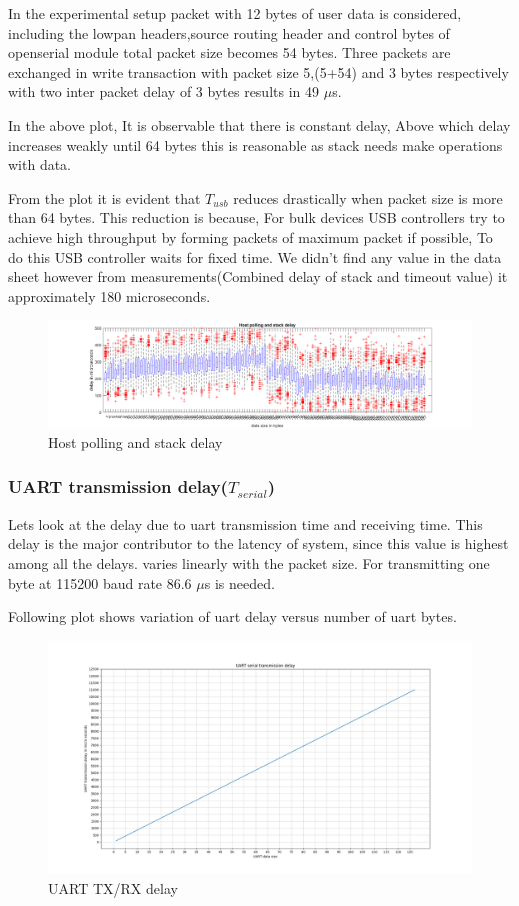In the experimental setup packet with 12 bytes of user data is considered, including the lowpan headers,source routing header and control bytes of openserial module total packet size becomes 54 bytes. Three packets are exchanged in write transaction with packet size 5,(5+54) and 3 bytes respectively with two inter packet delay of 3 bytes results in 49 $\mu$s.

In the above plot, It is observable that there is constant delay, Above which delay increases weakly until 64 bytes this is reasonable as stack needs make operations with data.

From the plot it is evident that $T_{usb}$ reduces drastically when packet size is more than 64 bytes. This reduction is because, For bulk devices USB controllers try to achieve high throughput by forming packets of maximum packet if possible, To do this USB controller waits for fixed time. We didn't find any value in the data sheet  however from measurements(Combined delay of stack and timeout value) it approximately 180 microseconds.

\begin{figure}[H]
	\includegraphics[width=1.4\textwidth,center]{untitled2.png}
	\caption{Host polling and stack delay}
	\label{fig:Host_polling_and_stack_delay}
\end{figure}

\subsubsection{UART transmission delay($T_{serial}$)}
Lets look at the delay due to uart transmission time and receiving time.
This delay is the major contributor to the latency of system, since this value is highest among all the delays. varies linearly with the packet size.
For transmitting one byte at 115200 baud rate 86.6 $\mu$s is needed.

Following plot shows variation of uart delay versus number of uart bytes.
\begin{figure}[H]
	\includegraphics[width=1\textwidth,center]{UART_tx_delay.png}
	\caption{UART TX/RX delay}
	\label{fig:UART transmission delay}
\end{figure}

